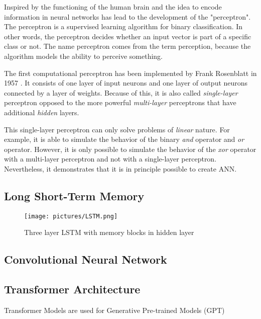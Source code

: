 Inspired by the functioning of the human brain and the idea to encode information in neural networks has lead to the development of the "perceptron". The perceptron is a supervised learning algorithm for binary classification. In other words, the perceptron decides whether an input vector is part of a specific class or not. The name perceptron comes from the term perception, because the algorithm models the ability to perceive something. 

The first computational perceptron has been implemented by Frank Rosenblatt in 1957 \cite{Rosenblatt_1957}.  It consists of one layer of input neurons and one layer of output neurons connected by a layer of weights. Because of this, it is also called \textit{single-layer} perceptron opposed to the more powerful \textit{multi-layer} perceptrons that have additional \textit{hidden} layers.

This single-layer perceptron can only solve problems of \textit{linear} nature. For example, it is able to simulate the behavior of the binary \textit{and} operator and \textit{or} operator. However, it is only possible to simulate the behavior of the \textit{xor} operator with a multi-layer perceptron and not with a single-layer perceptron. Nevertheless, it demonstrates that it is in principle possible to create \ac{ANN}.

\cite{haykin2009neural}

\subsection{Long Short-Term Memory}
\begin{figure}[ht]
    \centering 
    \texttt{[image: pictures/LSTM.png]}
    \caption{Three layer LSTM with memory blocks in hidden layer \cite{gers2000learning}}
    \label{pic:LSTM}    %
\end{figure}

\cite{hochreiter1997long,hochreiter2001gradient}
\subsection{Convolutional Neural Network}
\subsection{Transformer Architecture}
\label{Transformer}
Transformer Models are used for Generative Pre-trained Models (GPT)
\cite{vaswaniattentionneed}

